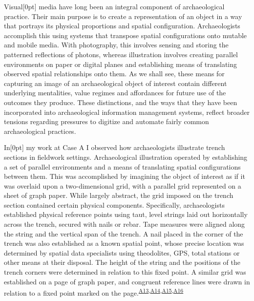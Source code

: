 \documentclass[
]{article}
\newcommand{\paragraphnumber}[1]{\marginnote{\color{lightgray}\tiny{#1}}[0pt]}
\begin{document}
Visual\paragraphnumber{[49]} media have long been an integral component
of archaeological practice. Their main purpose is to create a
representation of an object in a way that portrays its physical
proportions and spatial configuration. Archaeologists accomplish this
using systems that transpose spatial configurations onto mutable and
mobile media. With photography, this involves sensing and storing the
patterned reflections of photons, whereas illustration involves creating
parallel environments on paper or digital planes and establishing means
of translating observed spatial relationships onto them. As we shall
see, these means for capturing an image of an archaeological object of
interest contain different underlying mentalities, value regimes and
affordances for future use of the outcomes they produce. These
distinctions, and the ways that they have been incorporated into
archaeological information management systems, reflect broader tensions
regarding pressures to digitize and automate fairly common
archaeological practices.

In\paragraphnumber{[50]} my work at Case A I observed how archaeologists
illustrate trench sections in fieldwork settings. Archaeological
illustration operated by establishing a set of parallel environments and
a means of translating spatial configurations between them. This was
accomplished by imagining the object of interest as if it was overlaid
upon a two-dimensional grid, with a parallel grid represented on a sheet
of graph paper. While largely abstract, the grid imposed on the trench
section contained certain physical components. Specifically,
archaeologists established physical reference points using taut, level
strings laid out horizontally across the trench, secured with nails or
rebar. Tape measures were aligned along the string and the vertical span
of the trench. A nail placed in the corner of the trench was also
established as a known spatial point, whose precise location was
determined by spatial data specialists using theodolites, GPS, total
stations or other means at their disposal. The height of the string and
the positions of the trench corners were determined in relation to this
fixed point. A similar grid was established on a page of graph paper,
and congruent reference lines were drawn in relation to a fixed point
marked on the
page.\textsuperscript{\hyperref[sec-A13]{A13},\hyperref[sec-A14]{A14},\hyperref[sec-A15]{A15},\hyperref[sec-A16]{A16}}
\end{document}
